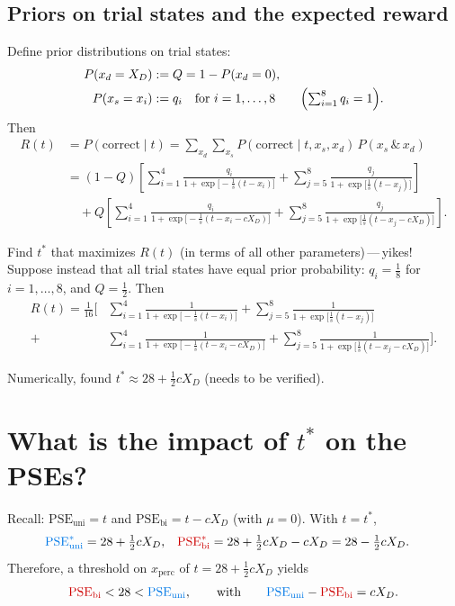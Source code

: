 \documentclass[11pt]{article}
\newcommand{\xp}{x_{\text{perc}}}
\newcommand{\PSEuni}{\mathrm{PSE}_{\text{uni}}}
\newcommand{\PSEbi}{\mathrm{PSE}_{\text{bi}}}
\begin{document}
\subsection{Priors on trial states and the expected reward}

Define prior distributions on trial states:
\begin{align*}
  P(x_d = X_D) &:= Q = 1 - P(x_d = 0),\\
  P(x_s = x_i) &:= q_i \quad\text{for } i = 1,\dots,8 \qquad \Bigl(\textstyle\sum_{i=1}^{8} q_i = 1\Bigr).
\end{align*}
Then
\begin{align*}
  R(t) &= P(\text{correct}\mid t)
  = \sum_{x_d}\sum_{x_s} P(\text{correct}\mid t, x_s, x_d)\, P(x_s \,\&\, x_d)\\
  &= (1-Q)\left[\sum_{i=1}^{4}\frac{q_i}{1+\exp\bigl[-\frac{1}{s}(t-x_i)\bigr]}
     + \sum_{j=5}^{8}\frac{q_j}{1+\exp\bigl[\frac{1}{s}(t-x_j)\bigr]}\right]\\
  &\quad + Q\left[\sum_{i=1}^{4}\frac{q_i}{1+\exp\bigl[-\frac{1}{s}(t-x_i-cX_D)\bigr]}
     + \sum_{j=5}^{8}\frac{q_j}{1+\exp\bigl[\frac{1}{s}(t-x_j-cX_D)\bigr]}\right].
\end{align*}

Find $t^*$ that maximizes $R(t)$ (in terms of all other parameters)\,---\,yikes!
Suppose instead that all trial states have equal prior probability:
$q_i = \tfrac18$ for $i = 1,\dots,8$, and $Q = \tfrac12$. Then
\begin{align*}
  R(t) = \frac{1}{16}\Biggl[
   &\sum_{i=1}^{4}\frac{1}{1+\exp\bigl[-\frac{1}{s}(t-x_i)\bigr]}
   + \sum_{j=5}^{8}\frac{1}{1+\exp\bigl[\frac{1}{s}(t-x_j)\bigr]}\\
   +&\sum_{i=1}^{4}\frac{1}{1+\exp\bigl[-\frac{1}{s}(t-x_i-cX_D)\bigr]}
   + \sum_{j=5}^{8}\frac{1}{1+\exp\bigl[\frac{1}{s}(t-x_j-cX_D)\bigr]}\Biggr].
\end{align*}

\begin{result}
Numerically, found
\(\displaystyle t^* \approx 28 + \tfrac12 c X_D\)
\quad(needs to be verified).
\end{result}

\section{What is the impact of $t^*$ on the PSEs?}

Recall: $\PSEuni = t$ and $\PSEbi = t - cX_D$ (with $\mu = 0$). With $t = t^*$,
\begin{align*}
  \color{unicol}\PSEuni^* &= 28 + \tfrac12 cX_D, &
  \color{bicol}\PSEbi^* &= 28 + \tfrac12 cX_D - cX_D = 28 - \tfrac12 cX_D.
\end{align*}
Therefore, a threshold on $\xp$ of $t = 28 + \frac12 cX_D$ yields
\[
  {\color{bicol}\PSEbi} < 28 < {\color{unicol}\PSEuni},
  \qquad\text{with}\qquad
  {\color{unicol}\PSEuni} - {\color{bicol}\PSEbi} = c X_D .
\]
\end{document}
